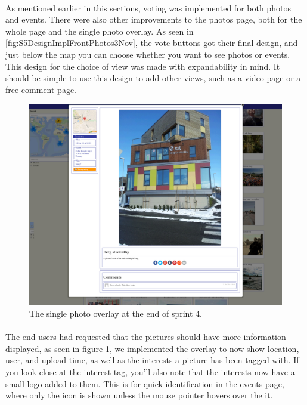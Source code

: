 \paragraph{} As mentioned earlier in this sections, voting was implemented for both photos and events. There were also other improvements to the photos page, both for the whole page and the single photo overlay. As seen in \ref{fig:S5DesignImplFrontPhotos3Nov}, the vote buttons got their final design, and just below the map you can choose whether you want to see photos or events. This design for the choice of view was made with expandability in mind. It should be simple to use this design to add other views, such as a video page or a free comment page.

\begin{figure}[ht!]
  \centering
  \includegraphics[width=\linewidth]{./img/webpage/3Nov/PhotoOverlay}
  \caption{The single photo overlay at the end of sprint 4.}
  \label{fig:S5DesignImplPhotoOverlay3Nov}
\end{figure}

\paragraph{} The end users had requested that the pictures should have more information displayed, as seen in figure \ref{fig:S5DesignImplPhotoOverlay3Nov}, we implemented the overlay to now show location, user, and upload time, as well as the interests a picture has been tagged with. If you look close at the interest tag, you'll also note that the interests now have a small logo added to them. This is for quick identification in the events page, where only the icon is shown unless the mouse pointer hovers over the it.

